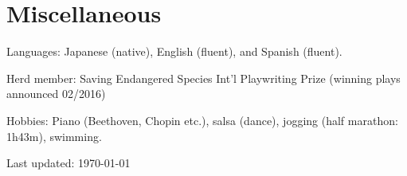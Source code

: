 \documentclass[11pt,letter]{article}
\renewenvironment{itemize}{
  \begin{list}{}{
    \setlength{\leftmargin}{1.5em}
    \setlength{\itemsep}{0.25em}
    \setlength{\parskip}{0pt}
    \setlength{\parsep}{0.25em}
  }
}{
  \end{list}
}
\begin{document}
\begin{itemize}
\begin{tabular}{ll}






\end{tabular}

\end{itemize}


\section*{\bf \normalsize Miscellaneous}

\begin{itemize}

\item Languages: Japanese (native), English (fluent), and Spanish (fluent).

\item
Herd member: Saving Endangered Species Int'l Playwriting Prize (winning plays announced 02/2016)

\item
Hobbies: Piano (Beethoven, Chopin etc.), salsa (dance), jogging (half marathon: 1h43m), swimming.

\end{itemize}

\begin{center}
  \begin{small}
    Last updated: \today
  \end{small}
\end{center}
\end{document}
